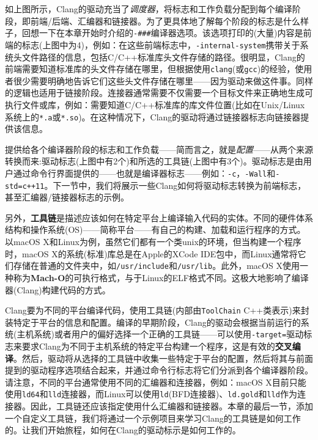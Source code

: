 如上图所示，Clang的驱动充当了\textit{调度器}，将标志和工作负载分配到每个编译阶段，即前端/后端、汇编器和链接器。为了更具体地了解每个阶段的标志是什么样子，回想一下在本章开始时介绍的\texttt{-\#\#\#}编译器选项。该选项打印的(大量)内容是前端的标志(上图中为4)，例如：在这些前端标志中，\texttt{-internal-system}携带关于系统头文件路径的信息，包括C/C++标准库头文件存储的路径。很明显，Clang的前端需要知道标准库的头文件存储在哪里，但根据使用\texttt{clang}(或\texttt{gcc})的经验，使用者很少需要明确地告诉它们这些头文件存储在哪里——因为驱动来做这件事。同样的逻辑也适用于链接阶段。连接器通常需要不仅需要一个目标文件来正确地生成可执行文件或库，例如：需要知道C/C++标准库的库文件位置(比如在Unix/Linux系统上的\texttt{*.a}或\texttt{*.so})。在这种情况下，Clang的驱动将通过链接器标志向链接器提供该信息。

提供给各个编译器阶段的标志和工作负载——简而言之，就是\textit{配置}——从两个来源转换而来:驱动标志(上图中有2个)和所选的工具链(上图中有3个)。驱动标志是由用户通过命令行界面提供的——也就是编译器标志——例如：\texttt{-c}，\texttt{-Wall}和\texttt{-std=c++11}。下一节中，我们将展示一些Clang如何将驱动标志转换为前端标志，甚至汇编器/链接器标志的示例。

另外，\textbf{工具链}是描述应该如何在特定平台上编译输入代码的实体。不同的硬件体系结构和操作系统(OS)——简称平台——有自己的构建、加载和运行程序的方式。以macOS X和Linux为例，虽然它们都有一个类unix的环境，但当构建一个程序时，macOS X的系统(标准)库总是在Apple的XCode IDE包中，而Linux通常将它们存储在普通的文件夹中，如\texttt{/usr/include}和\texttt{/usr/lib}。此外，macOS X使用一种称为\textbf{Mach-O}的可执行格式，与于Linux的ELF格式不同。这极大地影响了编译器(Clang)构建代码的方式。

Clang要为不同的平台编译代码，使用工具链(内部由\texttt{ToolChain} C++类表示)来封装特定于平台的信息和配置。编译的早期阶段，Clang的驱动会根据当前运行的系统(主机系统)或者用户的偏好选择一个正确的工具链——可以使用\texttt{-target=}驱动标志来要求Clang为不同于主机系统的特定平台构建一个程序，这是有效的\textbf{交叉编译}。然后，驱动将从选择的工具链中收集一些特定于平台的配置，然后将其与前面提到的驱动程序选项结合起来，并通过命令行标志将它们分派到各个编译器阶段。请注意，不同的平台通常使用不同的汇编器和连接器，例如：macOS X目前只能使用\texttt{ld64}和\texttt{lld}连接器，而Linux可以使用\texttt{ld}(BFD连接器)、\texttt{ld.gold}和\texttt{lld}作为连接器。因此，工具链还应该指定使用什么汇编器和链接器。本章的最后一节，添加一个自定义工具链，我们将通过一个示例项目来学习Clang的工具链是如何工作的。让我们开始旅程，如何在Clang的驱动标示是如何工作的。






























